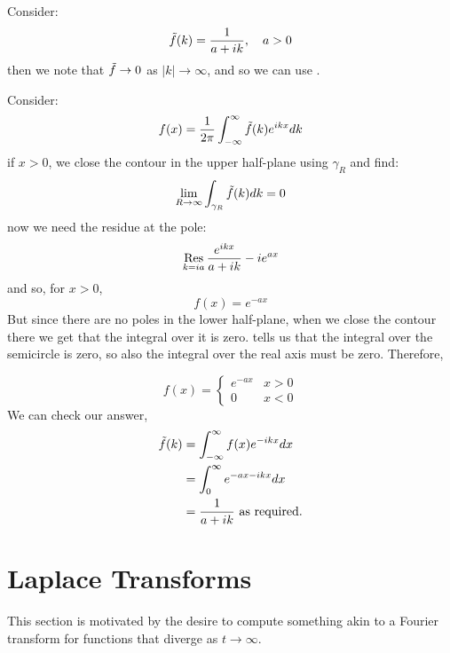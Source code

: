 \documentclass[../Main.tex]{subfiles}
\begin{document}
\begin{example}[Exponentials]
    Consider:
    \begin{equation*}
        \tilde{f}(k) = \frac{1}{a + ik},\quad a>0
    \end{equation*}
    then we note that $\tilde{f} \to 0$ as $|k| \to \infty$, and so we can use .

    Consider:
    \begin{equation*}
        f(x) = \frac{1}{2\pi} \int_{-\infty}^{\infty} \tilde{f}(k) e^{ikx} dk
    \end{equation*}
    if $x > 0$, we close the contour in the upper half-plane using $\gamma_R$ and find:
    \begin{equation*}
        \lim_{R \to \infty} \int_{\gamma_R} \tilde{f}(k) dk = 0
    \end{equation*}
    now we need the residue at the pole:
    \begin{equation*}
        \operatorname*{Res}_{k = ia} \frac{e^{ikx}}{a + ik} -ie^{ax}
    \end{equation*}
    and so, for $x > 0$,
    \begin{equation*}
        f(x) = e^{-ax}
    \end{equation*}
    But since there are no poles in the lower half-plane, when we close the contour there we get that the integral over it is zero.  tells us that the integral over the semicircle is zero, so also the integral over the real axis must be zero. Therefore,

    \begin{equation*}
        f(x) = 
        \begin{cases}
            e^{-ax} & x > 0 \\
            0 & x < 0
        \end{cases}
    \end{equation*}
    We can check our answer,
    \begin{align*}
        \tilde{f}(k) &= \int_{-\infty}^{\infty} f(x)e^{-ikx} dx \\
        &= \int_{0}^{\infty} e^{-ax - ikx} dx \\
        &= \frac{1}{a + ik} \text{ as required.}
    \end{align*}
\end{example}
\section{Laplace Transforms}
This section is motivated by the desire to compute something akin to a Fourier transform for functions that diverge as $t \to \infty$.
\end{document}
